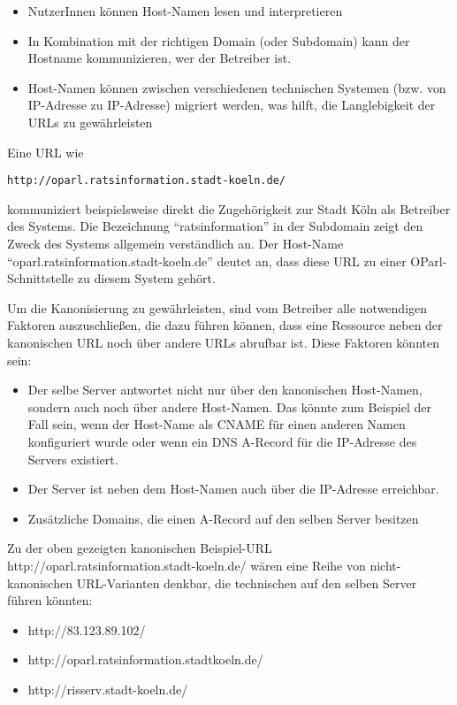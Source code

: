 \documentclass[,a4paper]{article}
\begin{document}
\begin{itemize}
\item
  NutzerInnen können Host-Namen lesen und interpretieren
\item
  In Kombination mit der richtigen Domain (oder Subdomain) kann der
  Hostname kommunizieren, wer der Betreiber ist.
\item
  Host-Namen können zwischen verschiedenen technischen Systemen (bzw.
  von IP-Adresse zu IP-Adresse) migriert werden, was hilft, die
  Langlebigkeit der URLs zu gewährleisten
\end{itemize}

Eine URL wie

\begin{verbatim}
http://oparl.ratsinformation.stadt-koeln.de/
\end{verbatim}

kommuniziert beispielsweise direkt die Zugehörigkeit zur Stadt Köln als
Betreiber des Systems. Die Bezeichnung ``ratsinformation'' in der
Subdomain zeigt den Zweck des Systems allgemein verständlich an. Der
Host-Name ``oparl.ratsinformation.stadt-koeln.de'' deutet an, dass diese
URL zu einer OParl-Schnittstelle zu diesem System gehört.

Um die Kanonisierung zu gewährleisten, sind vom Betreiber alle
notwendigen Faktoren auszuschließen, die dazu führen können, dass eine
Ressource neben der kanonischen URL noch über andere URLs abrufbar ist.
Diese Faktoren könnten sein:

\begin{itemize}
\item
  Der selbe Server antwortet nicht nur über den kanonischen Host-Namen,
  sondern auch noch über andere Host-Namen. Das könnte zum Beispiel der
  Fall sein, wenn der Host-Name als CNAME für einen anderen Namen
  konfiguriert wurde oder wenn ein DNS A-Record für die IP-Adresse des
  Servers existiert.
\item
  Der Server ist neben dem Host-Namen auch über die IP-Adresse
  erreichbar.
\item
  Zusätzliche Domains, die einen A-Record auf den selben Server besitzen
\end{itemize}

Zu der oben gezeigten kanonischen Beispiel-URL
http://oparl.ratsinformation.stadt-koeln.de/ wären eine Reihe von
nicht-kanonischen URL-Varianten denkbar, die technischen auf den selben
Server führen könnten:

\begin{itemize}
\item
  http://83.123.89.102/
\item
  http://oparl.ratsinformation.stadtkoeln.de/
\item
  http://risserv.stadt-koeln.de/
\end{itemize}
\end{document}
